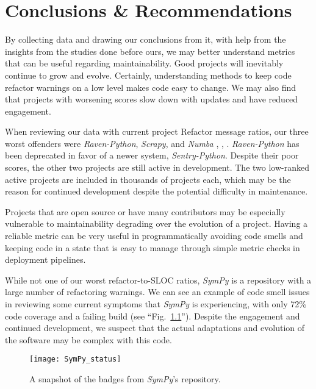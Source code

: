 \chapter{Conclusions \& Recommendations} \label{chapterConclusion}


By collecting data and drawing our conclusions from it, with help from the insights from the studies done before ours, we may better understand metrics that can be useful regarding maintainability. Good projects will inevitably continue to grow and evolve. Certainly, understanding methods to keep code refactor warnings on a low level makes code easy to change. We may also find that projects with worsening scores slow down with updates and have reduced engagement.

When reviewing our data with current project Refactor message ratios, our three worst offenders were \emph{Raven-Python}, \emph{Scrapy}, and \emph{Numba} \cite{data:raven-python}, \cite{data:scrapy}, \cite{data:numba}.  \emph{Raven-Python} has been deprecated in favor of a newer system,  \emph{Sentry-Python}. Despite their poor scores, the other two projects are still active in development. The two low-ranked active projects are included in thousands of projects each, which may be the reason for continued development despite the potential difficulty in maintenance.

Projects that are open source or have many contributors may be especially vulnerable to maintainability degrading over the evolution of a project. Having a reliable metric can be very useful in programmatically avoiding code smells and keeping code in a state that is easy to manage through simple metric checks in deployment pipelines.

While not one of our worst refactor-to-SLOC ratios, \emph{SymPy} is a repository with a large number of refactoring warnings. We can see an example of code smell issues in reviewing some current symptoms that \emph{SymPy} is experiencing, with only 72\% code coverage and a failing build (see ``Fig.~\ref{figSymPyStatus}''). Despite the engagement and continued development, we suspect that the actual adaptations and evolution of the software may be complex with this code.

\begin{figure}[ht]
  \centerline{
    \texttt{[image: SymPy\_status]}
  }
  \caption{A snapshot of the badges from \emph{SymPy}'s repository.}
    \label{figSymPyStatus}
\end{figure}

